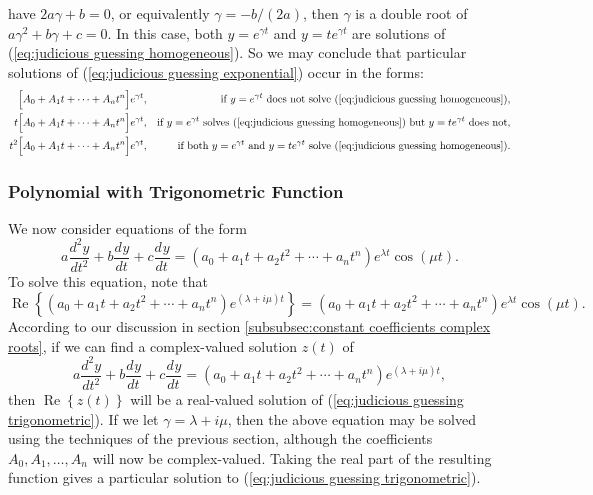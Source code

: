 \documentclass{myart}
\newcommand{\eq}[1]{(\ref{eq:#1})}
\newcommand{\deriv}[3][]{\frac{d^{#1}#2}{d#3^{#1}}}
\DeclareMathOperator{\OpRe}{Re}
\renewcommand{\Re}[1]{\OpRe\left\{#1\right\}}
\begin{document}
have $2a\gamma + b = 0$, or equivalently $\gamma = -b/(2a)$, then
$\gamma$ is a double root of $a\gamma^2 + b\gamma + c = 0$. In this
case, both $y = e^{\gamma t}$ and $y = te^{\gamma t}$ are solutions of
\eq{judicious guessing homogeneous}. So we may conclude that
particular solutions of \eq{judicious guessing exponential} occur in
the forms:
\begin{align*}
        \Big[A_0 + A_1t + \cdots + A_nt^n\Big] e^{\gamma t},
  && \text{if $y = e^{\gamma t}$ does not solve
     \eq{judicious guessing homogeneous}}, \\
     t  \Big[A_0 + A_1t + \cdots + A_nt^n\Big] e^{\gamma t},
  && \text{if $y = e^{\gamma t}$ solves
           \eq{judicious guessing homogeneous}
           but $y = te^{\gamma t}$ does not}, \\
     t^2\Big[A_0 + A_1t + \cdots + A_nt^n\Big] e^{\gamma t},
  && \text{if both $y = e^{\gamma t}$ and $y = te^{\gamma t}$
           solve \eq{judicious guessing homogeneous}}.
\end{align*}

\subsubsection{Polynomial with Trigonometric Function}
\label{subsubsec:judicious guessing trigonometric}

We now consider equations of the form
\begin{equation} \label{eq:judicious guessing trigonometric}
    a \deriv[2]{y}{t} + b \deriv{y}{t} + c \deriv{y}{t}
  = (a_0 + a_1t + a_2t^2 + \cdots + a_nt^n) e^{\lambda t} \cos(\mu t).
\end{equation}
To solve this equation, note that
\begin{equation*}
    \Re{(a_0 + a_1t + a_2t^2 + \cdots + a_nt^n)
        e^{(\lambda + i \mu) t}}
  = (a_0 + a_1t + a_2t^2 + \cdots + a_nt^n) e^{\lambda t} \cos(\mu t).
\end{equation*}
According to our discussion in section \ref{subsubsec:constant
  coefficients complex roots}, if we can find a complex-valued
solution $z(t)$ of
\begin{equation*}
    a \deriv[2]{y}{t} + b \deriv{y}{t} + c \deriv{y}{t}
  = (a_0 + a_1t + a_2t^2 + \cdots + a_nt^n) e^{(\lambda + i \mu) t},
\end{equation*}
then $\Re{z(t)}$ will be a real-valued solution of \eq{judicious
  guessing trigonometric}. If we let $\gamma = \lambda + i \mu$, then
the above equation may be solved using the techniques of the previous
section, although the coefficients $A_0, A_1, \ldots, A_n$ will now be
complex-valued. Taking the real part of the resulting function gives a
particular solution to \eq{judicious guessing trigonometric}.
\end{document}
